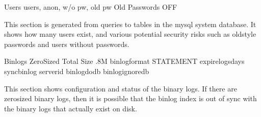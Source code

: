 \documentclass[letterpaper,10pt,english]{sphinxmanual}
\begin{document}
\begin{sphinxVerbatim}[commandchars=\\\{\}]
                    Users   users,  anon,  w/o pw,  old pw
            Old Passwords  OFF
\end{sphinxVerbatim}

\sphinxAtStartPar
This section is generated from queries to tables in the mysql system database.
It shows how many users exist, and various potential security risks such as
old\sphinxhyphen{}style passwords and users without passwords.

\begin{sphinxVerbatim}[commandchars=\\\{\}]
                  Binlogs  
               Zero\PYGZhy{}Sized  
               Total Size  .8M
            binlog\PYGZus{}format  STATEMENT
         expire\PYGZus{}logs\PYGZus{}days  
              sync\PYGZus{}binlog  
                server\PYGZus{}id  
             binlog\PYGZus{}do\PYGZus{}db 
         binlog\PYGZus{}ignore\PYGZus{}db 
\end{sphinxVerbatim}

\sphinxAtStartPar
This section shows configuration and status of the binary logs. If there are
zero\sphinxhyphen{}sized binary logs, then it is possible that the binlog index is out of sync
with the binary logs that actually exist on disk.
\end{document}
